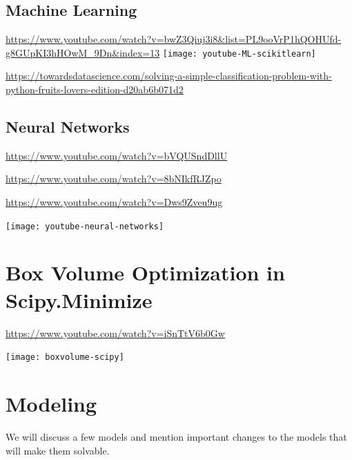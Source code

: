 \documentclass[../open-optimization/open-optimization.tex]{subfiles}
\begin{document}
\subsection{Machine Learning}

\url{https://www.youtube.com/watch?v=bwZ3Qiuj3i8&list=PL9ooVrP1hQOHUfd-g8GUpKI3hHOwM_9Dn&index=13}
\texttt{[image: youtube-ML-scikitlearn]}


\url{https://towardsdatascience.com/solving-a-simple-classification-problem-with-python-fruits-lovers-edition-d20ab6b071d2}

\subsection{Neural Networks}



\url{https://www.youtube.com/watch?v=bVQUSndDllU}

\url{https://www.youtube.com/watch?v=8bNIkfRJZpo}

\url{https://www.youtube.com/watch?v=Dws9Zveu9ug}

\texttt{[image: youtube-neural-networks]}


\section{Box Volume Optimization in Scipy.Minimize}
\url{https://www.youtube.com/watch?v=iSnTtV6b0Gw}

\texttt{[image: boxvolume-scipy]}
\section{Modeling}
We will discuss a few models and mention important changes to the models that will make them solvable.  
\end{document}
